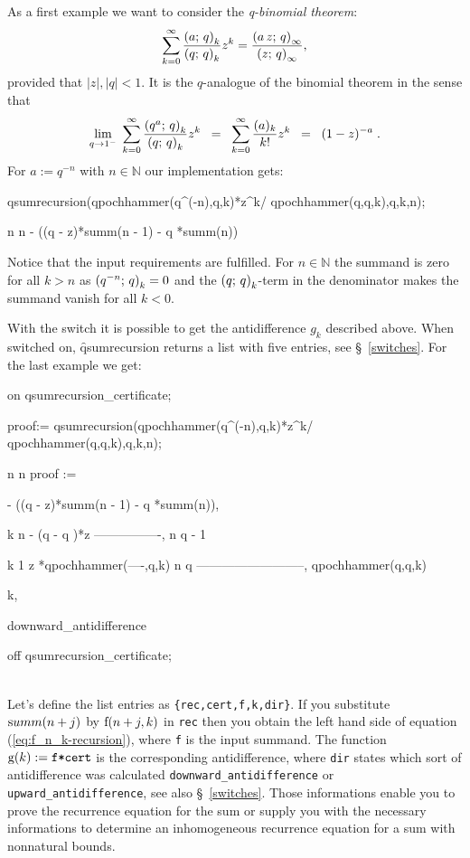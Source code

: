 As a first example we want to consider the {\sl q-binomial theorem}:
\[
	\sum_{k=0}^\infty{\frac{\left(a;\,q\right)_{k}}{\left(q;\,q\right)_{k}}z^k} =
	\frac{\left(a\,z;\,q\right)_{\infty}}{\left(z;\,q\right)_{\infty}},
\]
provided that $|z|,|q|<1$.
It is the $q$-analogue of the binomial theorem in the sense that
\[
	\lim_{q\rightarrow{}1^-}\;{\sum_{k=0}^\infty{
	\frac{\left(q^a;\,q\right)_{k}}{\left(q;\,q\right)_{k}}z^k}} \;\;=\;\; 
	\sum_{k=0}^\infty{\frac{(a)_k}{k!}z^k} \;\;=\;\; (1-z)^{-a}\;.
\]
For $a:=q^{-n}$ with $n\in\mathbb{N}$ our implementation gets:
\begin{redoutput}
\redprompt qsumrecursion(qpochhammer(q^(-n),q,k)*z^k/
   qpochhammer(q,q,k),q,k,n);

      n                     n
 - ((q  - z)*summ(n - 1) - q *summ(n))
\end{redoutput}
%
Notice that the input requirements are fulfilled. For $n\in\mathbb{N}$ the
summand is zero for all $k>n$ as $\left(q^{-n};\,q\right)_{k}=0$ and 
the $\left(q;\,q\right)_{k}$-term in the denominator makes the summand
vanish for all $k<0$.

With the switch  it is possible
to get the antidifference $g_k$ described above. When switched
on, \f{qsumrecursion} returns a list with five entries,
see \S~\ref{switches}. For the
last example we get:

\begin{redoutput}
\redprompt on qsumrecursion_certificate;

\redprompt proof:= qsumrecursion(qpochhammer(q^(-n),q,k)*z^k/
    qpochhammer(q,q,k),q,k,n);

                n                     n
proof := { - ((q  - z)*summ(n - 1) - q *summ(n)),

                k    n
            - (q  - q )*z
          ----------------,
                n
               q  - 1

            k              1
           z *qpochhammer(----,q,k)
                            n
                           q
          --------------------------,
              qpochhammer(q,q,k)

          k,

          downward_antidifference}

\redprompt off qsumrecursion_certificate;
\end{redoutput}
%
\\[-2.5ex]\noindent{}
Let's define the list entries as \texttt{\{rec,cert,f,k,dir\}}. If you
substitute ${\mathrm summ}(n+j)$ by ${\mathrm f}(n+j,k)$ in \texttt{rec} then
you obtain the left hand side of equation (\ref{eq:f_n_k-recursion}),
where \texttt{f} is the input summand. The function
${\mathrm g}(k):=\text{\texttt{f*cert}}$ is the corresponding
antidifference, where \texttt{dir} states which sort of antidifference
was calculated \texttt{downward\_antidifference} or 
\texttt{upward\_antidifference}, see also \S~\ref{switches}.
Those informations enable you to prove the recurrence equation for
the sum or supply you with the necessary informations to determine
an inhomogeneous recurrence equation for a sum with nonnatural bounds.

